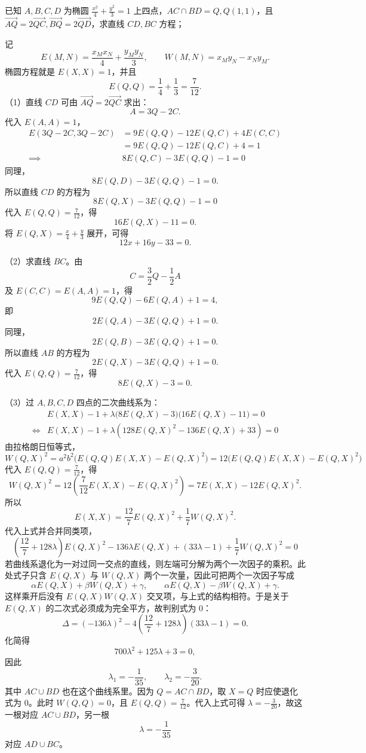 \begin{exercise}
已知 \(A,B,C,D\) 为椭圆 \(\frac{x^2}{4} + \frac{y^2}{3} = 1\) 上四点，\(AC \cap BD = Q, Q(1,1)\)，且 \(\overrightarrow{AQ} = 2\overrightarrow{QC}, \overrightarrow{BQ} = 2\overrightarrow{QD}\)，求直线 \(CD,BC\) 方程；
\end{exercise}
\begin{solution}
记
\[
E(M, N) = \frac{x_M x_N}{4} + \frac{y_M y_N}{3},\qquad W(M, N) = x_M y_N - x_N y_M.
\]
椭圆方程就是 $E(X, X) = 1$，并且
\[
E(Q, Q) = \frac{1}{4} + \frac{1}{3} = \frac{7}{12}.
\]
（1）直线 $CD$ 可由 $\overrightarrow{AQ} = 2\overrightarrow{QC}$ 求出：
\[
A = 3Q - 2C.
\]
代入 $E(A,A) = 1$，
\begin{align*}
E(3Q - 2C, 3Q - 2C) &= 9E(Q,Q) - 12E(Q,C) + 4E(C,C)\\
 &= 9E(Q,Q) - 12E(Q,C) + 4 = 1 \\
\implies& 8E(Q,C) - 3E(Q,Q) - 1 = 0
\end{align*}
同理，
\[
8E(Q,D) - 3E(Q,Q) - 1 = 0.
\]
所以直线 $CD$ 的方程为
\[ 8E(Q,X) - 3E(Q,Q) - 1 = 0 \]
代入 $E(Q,Q) = \frac{7}{12}$，得
\[
16E(Q,X) - 11 = 0.
\]
将 $E(Q,X) = \frac{x}{4} + \frac{y}{3}$ 展开，可得
\[
12x + 16y - 33 = 0.
\]

（2）求直线 $BC$。由
\[
C = \frac{3}{2}Q - \frac{1}{2}A
\]
及 $E(C,C)=E(A,A)=1$，得
\[
9E(Q,Q) - 6E(Q,A) + 1 = 4,
\]
即
\[
2E(Q,A) - 3E(Q,Q) + 1 = 0.
\]
同理，
\[
2E(Q,B) - 3E(Q,Q) + 1 = 0.
\]
所以直线 $AB$ 的方程为
\[
2E(Q,X) - 3E(Q,Q) + 1 = 0.
\]
代入 $E(Q,Q) = \frac{7}{12}$，得
\[
8E(Q,X) - 3 = 0.
\]

（3）过 $A,B,C,D$ 四点的二次曲线系为：
\begin{align*}
& E(X,X) - 1 + \lambda \big( 8E(Q,X) - 3 \big)\big( 16E(Q,X) - 11 \big) = 0\\
\Longleftrightarrow & E(X,X) - 1 + \lambda \left( 128E(Q,X)^2 - 136E(Q,X) + 33 \right) = 0
\end{align*}
由拉格朗日恒等式，
\[ W(Q,X)^2 = a^2b^2 \Big( E(Q,Q)E(X,X) - E(Q,X)^2 \Big)=12 \Big( E(Q,Q)E(X,X) - E(Q,X)^2 \Big)\]
代入 $E(Q,Q) = \frac{7}{12}$，得
\[ W(Q,X)^2 = 12 \left( \frac{7}{12}E(X,X) - E(Q,X)^2 \right) = 7E(X,X) - 12E(Q,X)^2. \]
所以
\[ E(X,X) = \frac{12}{7}E(Q,X)^2 + \frac{1}{7}W(Q,X)^2. \]
代入上式并合并同类项，
\[ \left( \frac{12}{7} + 128\lambda \right) E(Q,X)^2 - 136\lambda E(Q,X) + (33\lambda - 1) + \frac{1}{7}W(Q,X)^2 = 0\]
若曲线系退化为一对过同一交点的直线，则左端可分解为两个一次因子的乘积。此处式子只含 $E(Q,X)$ 与 $W(Q,X)$ 两个一次量，因此可把两个一次因子写成
\[
\alpha E(Q,X)+\beta W(Q,X)+\gamma,\qquad
\alpha E(Q,X)-\beta W(Q,X)+\gamma.
\]
这样乘开后没有 $E(Q,X)W(Q,X)$ 交叉项，与上式的结构相符。于是关于 $E(Q,X)$ 的二次式必须成为完全平方，故判别式为 $0$：
\[ \Delta = (-136\lambda)^2 - 4 \left( \frac{12}{7} + 128\lambda \right) (33\lambda - 1) = 0. \]
化简得
\[
700\lambda^2 + 125\lambda + 3 = 0,
\]
因此
\[
\lambda_1 = -\frac{1}{35},\qquad \lambda_2 = -\frac{3}{20}.
\]
其中 $AC \cup BD$ 也在这个曲线系里。因为 $Q=AC\cap BD$，取 $X=Q$ 时应使退化式为 $0$。此时 $W(Q,Q)=0$，且 $E(Q,Q)=\frac{7}{12}$。代入上式可得 $\lambda=-\frac{3}{20}$，故这一根对应 $AC \cup BD$，另一根
\[
\lambda = -\frac{1}{35}
\]
对应 $AD \cup BC$。


\end{solution}
